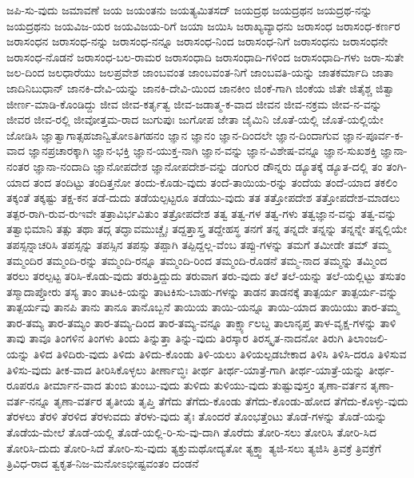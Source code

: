 ಜಪಿ-ಸು-ವುದು
ಜಮಾವಣೆ
ಜಯ
ಜಯಂತನು
ಜಯತ್ಯಮಿತಸದ್
ಜಯದ್ರಥ
ಜಯದ್ರಥನ
ಜಯದ್ರಥ-ನನ್ನು
ಜಯದ್ರಥನು
ಜಯವಿಜ-ಯರ
ಜಯವಿಜಯ-ರಿಗೆ
ಜಯಾ
ಜಯಿಸಿ
ಜರಾಖ್ಯವ್ಯಾಧನು
ಜರಾಸಂಧ
ಜರಾಸಂಧ-ಕರ್ಣರ
ಜರಾಸಂಧನ
ಜರಾಸಂಧ-ನನ್ನು
ಜರಾಸಂಧ-ನನ್ನೂ
ಜರಾಸಂಧ-ನಿಂದ
ಜರಾಸಂಧ-ನಿಗೆ
ಜರಾಸಂಧನು
ಜರಾಸಂಧನೇ
ಜರಾಸಂಧ-ನೊಡನೆ
ಜರಾಸಂಧ-ಬಲ-ರಾಮರ
ಜರಾಸಂಧಾದಿ
ಜರಾಸಂಧಾದಿ-ಗಳಿಂದ
ಜರಾಸಂಧಾದಿ-ಗಳು
ಜರಾ-ಸುತೇ
ಜಲ-ದಿಂದ
ಜಲಧಾರೆಯು
ಜಲಪ್ರವೇಶ
ಜಾಂಬವಂತ
ಜಾಂಬವಂತ-ನಿಗೆ
ಜಾಂಬವತಿ-ಯನ್ನು
ಜಾತಕರ್ಮಾದಿ
ಜಾತಾ
ಜಾದಿನಿಬುಧಾನ್
ಜಾನಕಿ-ದೇವಿ-ಯನ್ನು
ಜಾನಕಿ-ದೇವಿ-ಯಿಂದ
ಜಾನಕೀಂ
ಜಿಂಕೆ-ಗಾಗಿ
ಜಿಂಕೆಯ
ಜಿತೇ
ಜಿತೈಶ್ಚ
ಜಿತ್ವಾ
ಜೀರ್ಣ-ಮಾಡಿ-ಕೊಂಡಿದ್ದು
ಜೀವ
ಜೀವ-ಕರ್ತೃತ್ವ
ಜೀವ-ಜಡಾತ್ಮ-ಕ-ವಾದ
ಜೀವನ
ಜೀವ-ನಕ್ರಮ
ಜೀವ-ನ-ವನ್ನು
ಜೀವರ
ಜೀವ-ರಲ್ಲಿ
ಜೀವೋತ್ತಮ-ರಾದ
ಜುಗುಪುಃ
ಜುಗೋಪ
ಜೇತಾ
ಜೈಮಿನಿ
ಜೊತೆ-ಯಲ್ಲಿ
ಜೊತೆ-ಯಲ್ಲಿಯೇ
ಜೋಡಿಸಿ
ಜ್ಞಾತ್ವಾಗಾತ್ಸಹಜಾನ್ವಿತೋಽತಿಗಹನಂ
ಜ್ಞಾನ
ಜ್ಞಾನಂ
ಜ್ಞಾನ-ದಿಂದಲೇ
ಜ್ಞಾನ-ದಿಂದಾಗುವ
ಜ್ಞಾನ-ಪೂರ್ವ-ಕ-ವಾದ
ಜ್ಞಾನಪ್ರಚಾರಕ್ಕಾಗಿ
ಜ್ಞಾನ-ಭಕ್ತಿ
ಜ್ಞಾನ-ಯುಕ್ತ-ನಾಗಿ
ಜ್ಞಾನ-ವನ್ನು
ಜ್ಞಾನ-ವಿಶೇಷ-ವನ್ನೂ
ಜ್ಞಾನ-ಸುಖಶಕ್ತಿ
ಜ್ಞಾನಾ-ನಂತರ
ಜ್ಞಾನಾ-ನಂದಾದಿ
ಜ್ಞಾನೋಪದೇಶ
ಜ್ಞಾನೋಪದೇಶ-ವನ್ನು
ಡಂಗುರ
ಡೌನ್ನರು
ಡ್ಯೂತಕ್ಕೆ
ಡ್ಯೂತ-ದಲ್ಲಿ
ತಂ
ತಂಗಿ-ಯಾದ
ತಂದ
ತಂದಿಟ್ಟು
ತಂದಿತ್ತನೋ
ತಂದು-ಕೊಡು-ವುದು
ತಂದೆ-ತಾಯಿಯ-ರನ್ನು
ತಂದೆಯ
ತಂದೆ-ಯಾದ
ತಕಲಿಂ
ತಕ್ಕಂತೆ
ತಕ್ಕಷ್ಟು
ತಕ್ಷ-ಕನ
ತಡೆ-ದುದು
ತಡೆಯಲ್ಪಟ್ಟರೂ
ತಡೆಯು-ವುದು
ತತ
ತತ್ತೋಪದೇಶ
ತತ್ತೋಪದೇಶ-ಮಾಡಲು
ತತ್ಪರ-ರಾಗಿ-ರುವ-ರುಇವೇ
ತತ್ರಾವಿರ್ಭವಿತುಂ
ತತ್ರೋಪದೇಶ
ತತ್ವ
ತತ್ವ-ಗಳ
ತತ್ವ-ಗಳು
ತತ್ವಜ್ಞಾನ-ವನ್ನು
ತತ್ವ-ವನ್ನು
ತತ್ವಾಭಿಮಾನಿ
ತತ್ಸು
ತಥಾ
ತದ್ಗ
ತದ್ಘಾವಮುಚ್ಚೈಃ
ತದ್ದತ್ತಾಸ್ತ್ರ
ತದ್ದೇಹಸ್ಥ
ತನಗೆ
ತನ್ನ
ತನ್ನದೇ
ತನ್ನನ್ನು
ತನ್ನನ್ನೇ
ತನ್ನಲ್ಲಿಯೇ
ತಪಸ್ಸನ್ನಾಚರಿಸಿ
ತಪಸ್ಸನ್ನು
ತಪಸ್ಸಿನ
ತಪಸ್ಸು
ತಪ್ಪಾಗಿ
ತಪ್ಪಿದ್ದಲ್ಲ-ವೆಂಬ
ತಪ್ಪು-ಗಳನ್ನು
ತಮಗೆ
ತಮೀಡೇ
ತಮ್
ತಮ್ಮ
ತಮ್ಮಂದಿರ
ತಮ್ಮಂದಿ-ರನ್ನು
ತಮ್ಮಂದಿ-ರನ್ನೂ
ತಮ್ಮಂದಿ-ರಿಂದ
ತಮ್ಮಂದಿ-ರೊಡನೆ
ತಮ್ಮ-ನಾದ
ತಮ್ಮನ್ನು
ತಮ್ಮಿಂದ
ತರಲು
ತರಲ್ಪಟ್ಟ
ತರಿಸಿ-ಕೊಡು-ವುದು
ತರುತ್ತಿದ್ದುದು
ತರುವಾಗ
ತರು-ವುದು
ತಲೆ
ತಲೆ-ಯನ್ನು
ತಲೆ-ಯಲ್ಲಿಟ್ಟು
ತಸುತಂ
ತಸ್ಮಾದಾಪ್ತೋರು
ತಸ್ಯ
ತಾಂ
ತಾಟಕಿ-ಯನ್ನು
ತಾಟಕಿಸು-ಬಾಹು-ಗಳನ್ನು
ತಾಡನ
ತಾಡನಕ್ಕೆ
ತಾತ್ಪರ್ಯ
ತಾತ್ಪರ್ಯ-ವನ್ನು
ತಾತ್ಪರ್ಯವು
ತಾನಪಿ
ತಾನು
ತಾನೂ
ತಾನೊಬ್ಬನೆ
ತಾಯಿಯ
ತಾಯಿ-ಯನ್ನೂ
ತಾಯಿ-ಯಾದ
ತಾಯಿಯು
ತಾರ-ತಮ್ಮ
ತಾರ-ತಮ್ಯ
ತಾರ-ತಮ್ಯಂ
ತಾರ-ತಮ್ಯ-ದಿಂದ
ತಾರ-ತಮ್ಯ-ವನ್ನೂ
ತಾರ್ಕ್ಷ್ಯಾಲಬ್ದ
ತಾಲಾನೃಪ್ತ
ತಾಳ-ವೃಕ್ಷ-ಗಳನ್ನು
ತಾಳಿ
ತಾವು
ತಾವೂ
ತಿಂಗಳಿನ
ತಿಂಗಳು
ತಿಂದು
ತಿನ್ನುತ್ತಾ
ತಿನ್ನು-ವುದು
ತಿರಸ್ಕಾರ
ತಿರಸ್ಕೃತ-ನಾದನೋ
ತಿರುಗಿ
ತಿಲಾಂಜಲಿ-ಯನ್ನು
ತಿಳಿದ
ತಿಳಿದಿರು-ವುದು
ತಿಳಿದು
ತಿಳಿದು-ಕೊಂಡು
ತಿಳಿ-ಯಲು
ತಿಳಿಯಲ್ಪಡಬೇಕಾದ
ತಿಳಿಸಿ
ತಿಳಿಸಿ-ದರೂ
ತಿಳಿಸುವ
ತಿಳಿಸು-ವುದು
ತೀಕ-ವಾದ
ತೀರಿಸಿಕೊಳ್ಳಲು
ತೀರ್ಣಾಬ್ಧಿಃ
ತೀರ್ಥ
ತೀರ್ಥ-ಯಾತ್ರೆ-ಗಾಗಿ
ತೀರ್ಥ-ಯಾತ್ರೆ-ಯನ್ನು
ತೀರ್ಥ-ರೂಪರೂ
ತೀರ್ಮಾನ-ವಾದ
ತುಂಬಿ
ತುಂಬು-ವುದು
ತುಳಿದು
ತುಳಿಯು-ವುದು
ತುಷ್ಟುವುಸ್ತಂ
ತೃಣಾ-ವರ್ತನ
ತೃಣಾ-ವರ್ತ-ನನ್ನೂ
ತೃಣಾ-ವರ್ತರ
ತೃತೀಯ
ತೃಪ್ತಿ
ತೆಗೆದು
ತೆಗೆದು-ಕೊಂಡು
ತೆಗೆದು-ಕೊಂಡು-ಹೋದ
ತೆಗೆದು-ಕೊಳ್ಳು-ವುದು
ತೆರಳಲು
ತೆರಳಿ
ತೆರಳಿದ
ತೆರಳುವದು
ತೆರಳು-ವುದು
ತೈಃ
ತೊಂದರೆ
ತೊಂಭತ್ತೆಂಟು
ತೊಡೆ-ಗಳನ್ನು
ತೊಡೆ-ಯನ್ನು
ತೊಡೆಯ-ಮೇಲೆ
ತೊಡೆ-ಯಲ್ಲಿ
ತೊಡೆ-ಯಲ್ಲಿ-ರಿ-ಸು-ವು-ದಾಗಿ
ತೊರೆದು
ತೋರಿ-ಸಲು
ತೋರಿಸಿ
ತೋರಿ-ಸಿದ
ತೋರಿಸಿ-ದುದು
ತೋರಿ-ಸಿದೆ
ತೋರಿ-ಸು-ವುದು
ತ್ಯಕ್ತುಮಥೋದ್ಯತೋ
ತ್ಯಕ್ತ್ವಾ
ತ್ಯಜಿ-ಸಲು
ತ್ಯಜಿಸಿ
ತ್ರಿವಕ್ರೆ
ತ್ರಿವಕ್ರೆಗೆ
ತ್ರಿವಿಧ-ರಾದ
ತ್ವಕೃತ-ನಿಜ-ಮನೋಽಭೀಷ್ಟವಂತಂ
ದಂಡನೆ
